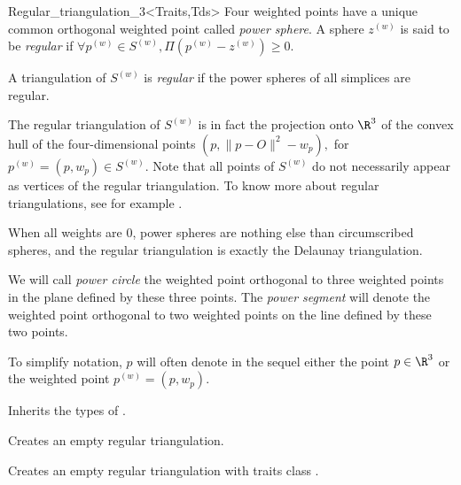 \begin{ccClassTemplate}{Regular_triangulation_3<Traits,Tds>}
Four weighted points have a unique common orthogonal weighted point called
\textit{power sphere}. A sphere ${z}^{(w)}$ is said to be
\textit{regular} if $\forall {p}^{(w)}\in{S}^{(w)},
\Pi{({p}^{(w)}-{z}^{(w)})}\geq 0$.

A triangulation of ${S}^{(w)}$ is \textit{regular} if the power spheres
of all simplices are regular. 

The regular triangulation of
${S}^{(w)}$ is in fact the projection onto $\R^3$ of the convex hull 
of the four-dimensional points $(p,\|p-O\|^2-w_p),$ for
${p}^{(w)}=(p,w_p)\in{S}^{(w)}$. 
Note that all points of ${S}^{(w)}$ do not
necessarily appear as vertices of the regular
triangulation. To know more about regular triangulations, see for
example \cite{es-itfwr-96}. 

When all weights are 0, power spheres are nothing else than
circumscribed spheres, and the regular triangulation is exactly the
Delaunay triangulation.

We will call \textit{power circle} the
weighted point orthogonal to three weighted points in the plane
defined by these three points. The \textit{power segment} will denote
the weighted point orthogonal to two weighted points on the line
defined by these two points.

To simplify notation, $p$ will often denote in the sequel either the
point $p\in\R^3$ or the weighted point ${p}^{(w)}=(p,w_p)$.




\ccTypes
{}

Inherits the types of .

\ccGlue
{}

\ccCreation
{}

{Creates an empty regular triangulation.}

{Creates an empty regular triangulation with traits class
.}


\end{ccClassTemplate}
